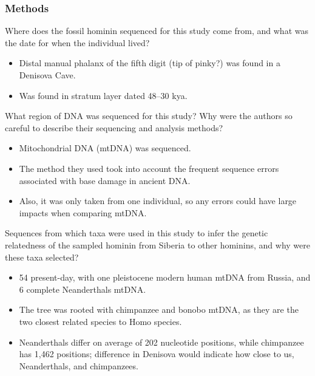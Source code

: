 \documentclass[12pt,a4paper]{article}
\begin{document}
\subsubsection{Methods}
\begin{itemize}
    {\color{G-Moon}\item Where does the fossil hominin sequenced for this study come from, and what was the date for when the individual lived?}
        \begin{itemize}
            \item Distal manual phalanx of the fifth digit (tip of pinky?) was found in a Denisova Cave.
            \item Was found in stratum layer dated 48--30 kya. 
        \end{itemize}
    {\color{G-Moon}\item What region of DNA was sequenced for this study? Why were the authors so careful to describe their sequencing and analysis methods?}
        \begin{itemize}
            \item Mitochondrial DNA (mtDNA) was sequenced.
            \item The method they used took into account the frequent sequence errors associated with base damage in ancient DNA. %
            \item Also, it was only taken from one individual, so any errors could have large impacts when comparing mtDNA. %
        \end{itemize}
    {\color{G-Moon}\item Sequences from which taxa were used in this study to infer the genetic relatedness of the sampled hominin from Siberia to other hominins, and why were these taxa selected?}
        \begin{itemize}
            \item 54 present-day, with one pleistocene modern human mtDNA from Russia, and 6 complete Neanderthals mtDNA. %
            \item The tree was rooted with chimpanzee and bonobo mtDNA, as they are the two closest related species to Homo species.
            \item Neanderthals differ on average of 202 nucleotide positions, while chimpanzee has 1,462 positions; difference in Denisova would indicate how close to us, Neanderthals, and chimpanzees.
        \end{itemize}
\end{itemize}
\end{document}
